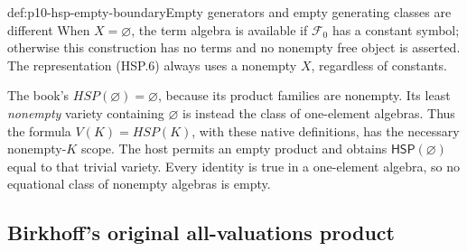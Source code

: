 \begin{hbwarning}{def:p10-hsp-empty-boundary}{Empty generators and empty generating classes are different}
When \(X=\varnothing\), the term algebra is available if \(\mathcal F_0\)
has a constant symbol; otherwise this construction has no terms
and no nonempty free object is asserted. The representation
(HSP.6) always uses a nonempty \(X\), regardless of constants.

The book's \(HSP(\varnothing)=\varnothing\), because its product
families are nonempty. Its least \emph{nonempty} variety containing
\(\varnothing\) is instead the class of one-element algebras.
Thus the formula \(V(K)=HSP(K)\), with these native definitions,
has the necessary nonempty-\(K\) scope.
The host permits an empty product and obtains
\(\mathsf H\mathsf S\mathsf P(\varnothing)\) equal to that
trivial variety. Every identity is true in a one-element algebra,
so no equational class of nonempty algebras is empty.
\end{hbwarning}

\subsection{Birkhoff's original all-valuations product}
\label{sec:p10-hsp-original-product}

